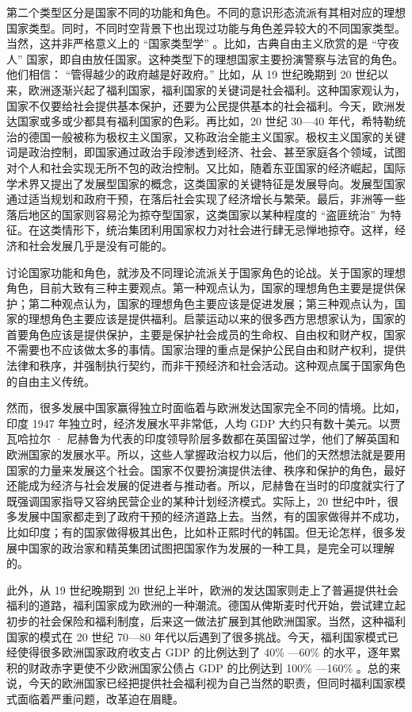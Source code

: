 第二个类型区分是国家不同的功能和角色。不同的意识形态流派有其相对应的理想国家类型。同时，不同时空背景下也出现过功能与角色差异较大的不同国家类型。当然，这并非严格意义上的 “国家类型学” 。比如，古典自由主义欣赏的是 “守夜人” 国家，即自由放任国家。这种类型下的理想国家主要扮演警察与法官的角色。他们相信： “管得越少的政府越是好政府。” 比如，从 19 世纪晚期到 20 世纪以来，欧洲逐渐兴起了福利国家，福利国家的关键词是社会福利。这种国家观认为，国家不仅要给社会提供基本保护，还要为公民提供基本的社会福利。今天，欧洲发达国家或多或少都具有福利国家的色彩。再比如，20 世纪 30—40 年代，希特勒统治的德国一般被称为极权主义国家，又称政治全能主义国家。极权主义国家的关键词是政治控制，即国家通过政治手段渗透到经济、社会、甚至家庭各个领域，试图对个人和社会实现无所不包的政治控制。又比如，随着东亚国家的经济崛起，国际学术界又提出了发展型国家的概念，这类国家的关键特征是发展导向。发展型国家通过适当规划和政府干预，在落后社会实现了经济增长与繁荣。最后，非洲等一些落后地区的国家则容易沦为掠夺型国家，这类国家以某种程度的 “盗匪统治” 为特征。在这类情形下，统治集团利用国家权力对社会进行肆无忌惮地掠夺。这样，经济和社会发展几乎是没有可能的。

讨论国家功能和角色，就涉及不同理论流派关于国家角色的论战。关于国家的理想角色，目前大致有三种主要观点。第一种观点认为，国家的理想角色主要是提供保护；第二种观点认为，国家的理想角色主要应该是促进发展；第三种观点认为，国家的理想角色主要应该是提供福利。启蒙运动以来的很多西方思想家认为，国家的首要角色应该是提供保护，主要是保护社会成员的生命权、自由权和财产权，国家不需要也不应该做太多的事情。国家治理的重点是保护公民自由和财产权利，提供法律和秩序，并强制执行契约，而非干预经济和社会活动。这种观点属于国家角色的自由主义传统。

然而，很多发展中国家赢得独立时面临着与欧洲发达国家完全不同的情境。比如，印度 1947 年独立时，经济发展水平非常低，人均 GDP 大约只有数十美元。以贾瓦哈拉尔 · 尼赫鲁为代表的印度领导阶层多数都在英国留过学，他们了解英国和欧洲国家的发展水平。所以，这些人掌握政治权力以后，他们的天然想法就是要用国家的力量来发展这个社会。国家不仅要扮演提供法律、秩序和保护的角色，最好还能成为经济与社会发展的促进者与推动者。所以，尼赫鲁在当时的印度就实行了既强调国家指导又容纳民营企业的某种计划经济模式。实际上，20 世纪中叶，很多发展中国家都走到了政府干预的经济道路上去。当然，有的国家做得并不成功，比如印度；有的国家做得极其出色，比如朴正熙时代的韩国。但无论怎样，很多发展中国家的政治家和精英集团试图把国家作为发展的一种工具，是完全可以理解的。

此外，从 19 世纪晚期到 20 世纪上半叶，欧洲的发达国家则走上了普遍提供社会福利的道路，福利国家成为欧洲的一种潮流。德国从俾斯麦时代开始，尝试建立起初步的社会保险和福利制度，后来这一做法扩展到其他欧洲国家。当然，这种福利国家的模式在 20 世纪 70—80 年代以后遇到了很多挑战。今天，福利国家模式已经使得很多欧洲国家政府收支占 GDP 的比例达到了 40\% —60\% 的水平，逐年累积的财政赤字更使不少欧洲国家公债占 GDP 的比例达到 100\% —160\% 。总的来说，今天的欧洲国家已经把提供社会福利视为自己当然的职责，但同时福利国家模式面临着严重问题，改革迫在眉睫。

